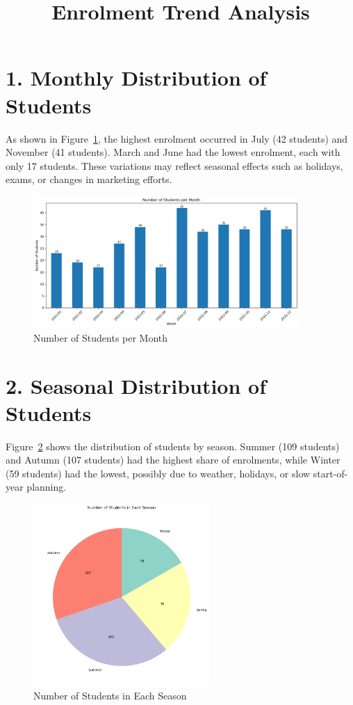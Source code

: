 \documentclass[12pt,a4paper]{article}
\title{Enrolment Trend Analysis}
\date{}
\begin{document}
\maketitle

\section*{1. Monthly Distribution of Students}

As shown in Figure~\ref{fig:monthly-students}, the highest enrolment occurred in July (42 students) and November (41 students). March and June had the lowest enrolment, each with only 17 students. These variations may reflect seasonal effects such as holidays, exams, or changes in marketing efforts.

\begin{figure}[h!]
    \centering
    \includegraphics[width=0.9\textwidth]{Number of Students per Month.png}
    \caption{Number of Students per Month}
    \label{fig:monthly-students}
\end{figure}

\section*{2. Seasonal Distribution of Students}

Figure~\ref{fig:seasonal-students} shows the distribution of students by season. Summer (109 students) and Autumn (107 students) had the highest share of enrolments, while Winter (59 students) had the lowest, possibly due to weather, holidays, or slow start-of-year planning.

\begin{figure}[h!]
    \centering
    \includegraphics[width=0.6\textwidth]{Number of Students in Each Season (Pie Chart).png}
    \caption{Number of Students in Each Season}
    \label{fig:seasonal-students}
\end{figure}
\end{document}

